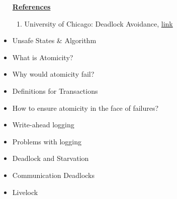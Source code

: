 \documentclass[12pt]{article}
\begin{document}
\begin{itemize}
\begin{itemize}
    \end{itemize}

    \bigskip

    \underline{\textbf{References}}

    \bigskip

    \begin{enumerate}[1)]
        \item University of Chicago: Deadlock Avoidance, \href{https://www.cs.uic.edu/~jbell/CourseNotes/OperatingSystems/7_Deadlocks.html}{link}
    \end{enumerate}
    \item Unsafe States \& Algorithm
    \item What is Atomicity?
    \item Why would atomicity fail?
    \item Definitions for Transactions
    \item How to ensure atomicity in the face of failures?
    \item Write-ahead logging
    \item Problems with logging
    \item Deadlock and Starvation
    \item Communication Deadlocks
    \item Livelock
\end{itemize}
\end{document}
